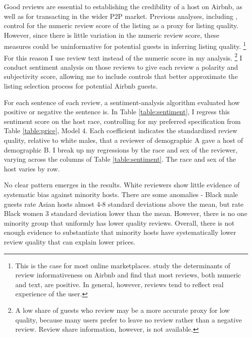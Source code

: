 Good reviews are essential to establishing the credibility of a host on Airbnb, as well as for transacting in the wider P2P market. Previous analyses, including \cite{edelman}, control for the numeric review score of the listing as a proxy for listing quality. However, since there is little variation in the numeric review score, these measures could be uninformative for potential guests in inferring listing quality.%
	\footnote{This is the case for most online marketplaces. \cite{fradkin} study the determinants of review informativeness on Airbnb and find that most reviews, both numeric and text, are positive. In general, however, reviews tend to reflect real experience of the user.} 
For this reason I use review text instead of the numeric score in my analysis.%
	\footnote{A low share of guests who review may be a more accurate proxy for low quality, because many users prefer to leave no review rather than a negative review. Review share information, however, is not available.} 
I conduct sentiment analysis on those reviews to give each review a polarity and subjectivity score, allowing me to include controls that better approximate the listing selection process for potential Airbnb guests.

For each sentence of each review, a sentiment-analysis algorithm evaluated how positive or negative the sentence is. In Table \ref{table:sentiment}, I regress this sentiment score on the host race, controlling for my preferred specification from Table \ref{table:price}, Model 4. Each coefficient indicates the standardized review quality, relative to white males, that a reviewer of demographic A gave a host of demographic B. I break up my regressions by the race and sex of the reviewer, varying across the columns of Table \ref{table:sentiment}. The race and sex of the host varies by row. 

No clear pattern emerges in the results. White reviewers show little evidence of systematic bias against minority hosts. There are some anomalies - Black male guests rate Asian hosts almost 4-8 standard deviations above the mean, but rate Black women 3 standard deviation lower than the mean. However, there is no one minority group that uniformly has lower quality reviews. Overall, there is not enough evidence to substantiate that minority hosts have systematically lower review quality that can explain lower prices. 













